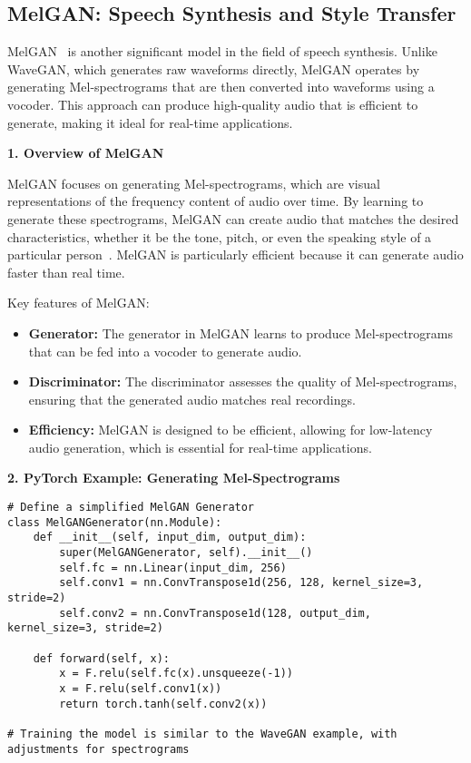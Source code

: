 \subsection{MelGAN: Speech Synthesis and Style Transfer}

MelGAN~\cite{kumar2019melgan} is another significant model in the field of speech synthesis. Unlike WaveGAN, which generates raw waveforms directly, MelGAN operates by generating Mel-spectrograms that are then converted into waveforms using a vocoder. This approach can produce high-quality audio that is efficient to generate, making it ideal for real-time applications.

\textbf{1. Overview of MelGAN}

MelGAN focuses on generating Mel-spectrograms, which are visual representations of the frequency content of audio over time. By learning to generate these spectrograms, MelGAN can create audio that matches the desired characteristics, whether it be the tone, pitch, or even the speaking style of a particular person~\cite{kumar2019melgan}. MelGAN is particularly efficient because it can generate audio faster than real time.

Key features of MelGAN:
\begin{itemize}
    \item \textbf{Generator:} The generator in MelGAN learns to produce Mel-spectrograms that can be fed into a vocoder to generate audio.
    \item \textbf{Discriminator:} The discriminator assesses the quality of Mel-spectrograms, ensuring that the generated audio matches real recordings.
    \item \textbf{Efficiency:} MelGAN is designed to be efficient, allowing for low-latency audio generation, which is essential for real-time applications.
\end{itemize}

\textbf{2. PyTorch Example: Generating Mel-Spectrograms}

\begin{lstlisting}[style=python]
# Define a simplified MelGAN Generator
class MelGANGenerator(nn.Module):
    def __init__(self, input_dim, output_dim):
        super(MelGANGenerator, self).__init__()
        self.fc = nn.Linear(input_dim, 256)
        self.conv1 = nn.ConvTranspose1d(256, 128, kernel_size=3, stride=2)
        self.conv2 = nn.ConvTranspose1d(128, output_dim, kernel_size=3, stride=2)
    
    def forward(self, x):
        x = F.relu(self.fc(x).unsqueeze(-1))
        x = F.relu(self.conv1(x))
        return torch.tanh(self.conv2(x))

# Training the model is similar to the WaveGAN example, with adjustments for spectrograms
\end{lstlisting}


